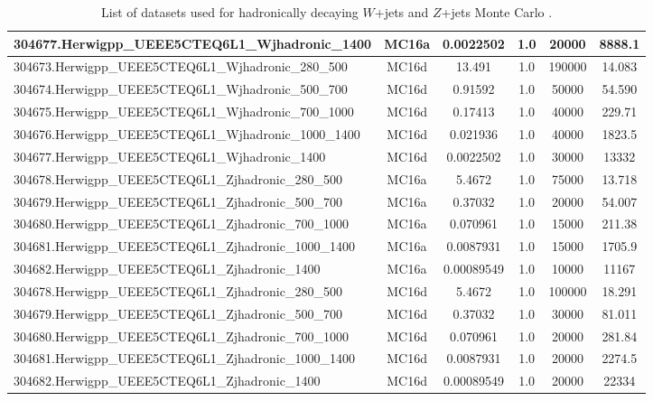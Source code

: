 \begin{sidewaystable}
{{\begin{tabular}{l|c|cccc}
    304677.Herwigpp\_UEEE5CTEQ6L1\_Wjhadronic\_1400 & MC16a & 0.0022502 & 1.0 & 20000 & 8888.1 \\
    \hline
    304673.Herwigpp\_UEEE5CTEQ6L1\_Wjhadronic\_280\_500 & MC16d & 13.491 & 1.0 & 190000 & 14.083 \\
    304674.Herwigpp\_UEEE5CTEQ6L1\_Wjhadronic\_500\_700 & MC16d & 0.91592 & 1.0 & 50000 & 54.590 \\
    304675.Herwigpp\_UEEE5CTEQ6L1\_Wjhadronic\_700\_1000 & MC16d & 0.17413 & 1.0 & 40000 & 229.71 \\
    304676.Herwigpp\_UEEE5CTEQ6L1\_Wjhadronic\_1000\_1400 & MC16d & 0.021936 & 1.0 & 40000 & 1823.5 \\
    304677.Herwigpp\_UEEE5CTEQ6L1\_Wjhadronic\_1400 & MC16d & 0.0022502 & 1.0 & 30000 & 13332 \\
    \hline
    \hline
    304678.Herwigpp\_UEEE5CTEQ6L1\_Zjhadronic\_280\_500 & MC16a & 5.4672 & 1.0 & 75000 & 13.718 \\
    304679.Herwigpp\_UEEE5CTEQ6L1\_Zjhadronic\_500\_700 & MC16a & 0.37032 & 1.0 & 20000 & 54.007 \\
    304680.Herwigpp\_UEEE5CTEQ6L1\_Zjhadronic\_700\_1000 & MC16a & 0.070961 & 1.0 & 15000 & 211.38 \\
    304681.Herwigpp\_UEEE5CTEQ6L1\_Zjhadronic\_1000\_1400 & MC16a & 0.0087931 & 1.0 & 15000 & 1705.9 \\
    304682.Herwigpp\_UEEE5CTEQ6L1\_Zjhadronic\_1400 & MC16a & 0.00089549 & 1.0 & 10000 & 11167 \\
    \hline
    304678.Herwigpp\_UEEE5CTEQ6L1\_Zjhadronic\_280\_500 & MC16d & 5.4672 & 1.0 & 100000 & 18.291 \\
    304679.Herwigpp\_UEEE5CTEQ6L1\_Zjhadronic\_500\_700 & MC16d & 0.37032 & 1.0 & 30000 & 81.011 \\
    304680.Herwigpp\_UEEE5CTEQ6L1\_Zjhadronic\_700\_1000 & MC16d & 0.070961 & 1.0 & 20000 & 281.84 \\
    304681.Herwigpp\_UEEE5CTEQ6L1\_Zjhadronic\_1000\_1400 & MC16d & 0.0087931 & 1.0 & 20000 & 2274.5 \\
    304682.Herwigpp\_UEEE5CTEQ6L1\_Zjhadronic\_1400 & MC16d & 0.00089549 & 1.0 & 20000 & 22334 \\
  \end{tabular}}
  }
\caption{List of datasets used for hadronically decaying $W$+jets and $Z$+jets Monte Carlo \cite{Krizka:2310645}.}
\label{table:data:V_hadronic}
\end{sidewaystable}

